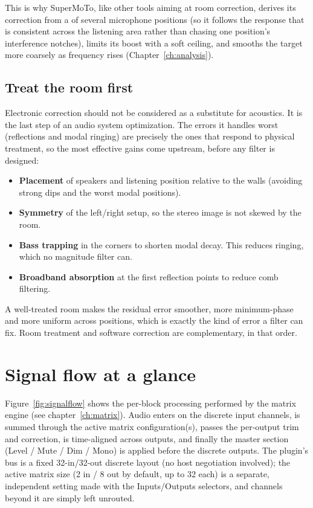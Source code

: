 This is why SuperMoTo, like other tools aiming at room correction, derives its correction from a  of several microphone positions (so it follows the response that is consistent across the listening area rather than chasing one position's interference notches), limits its boost with a soft ceiling, and smooths the target more coarsely as frequency rises (Chapter~\ref{ch:analysis}).

\subsection{Treat the room first}
Electronic correction should not be considered as a substitute for acoustics. It is the last step of an audio system optimization. The errors it handles worst (reflections and modal ringing) are precisely the ones that respond to physical treatment, so the most effective gains come upstream, before any filter is designed:

\begin{itemize}[nosep]
  \item \textbf{Placement} of speakers and listening position relative to the walls (avoiding strong  dips and the worst modal positions).
  \item \textbf{Symmetry} of the left/right setup, so the stereo image is not skewed by the room.
  \item \textbf{Bass trapping} in the corners to shorten modal decay. This reduces ringing, which no magnitude filter can.
  \item \textbf{Broadband absorption} at the first reflection points to reduce comb filtering.
\end{itemize}

A well-treated room makes the residual error smoother, more minimum-phase and more uniform across positions, which is exactly the kind of error a filter can fix. Room treatment and software correction are complementary, in that order.

\section{Signal flow at a glance}
Figure~\ref{fig:signalflow} shows the per-block processing performed by the matrix engine (see chapter~\ref{ch:matrix}). Audio enters on the discrete input channels, is summed through the active matrix configuration(s), passes the per-output trim and  correction, is time-aligned across outputs, and finally the master section (Level / Mute / Dim / Mono) is applied before the discrete outputs. The plugin's bus is a fixed 32-in/32-out discrete layout (no host negotiation involved); the active matrix size (2 in / 8 out by default, up to 32 each) is a separate, independent setting made with the Inputs/Outputs selectors, and channels beyond it are simply left unrouted.

